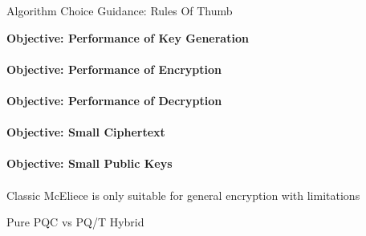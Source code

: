 \begin{minipage}[t]{0.7\textwidth}
\begin{algorithmbox}{Algorithm Choice Guidance: Rules Of Thumb}
\begin{minipage}[t]{0.5\textwidth}
            {\scriptsize \bfseries Objective: Performance of Key Generation}\\[0.1\baselineskip]
            \\[0.75\baselineskip]
            {\scriptsize \bfseries Objective: Performance of Encryption}\\[0.1\baselineskip]
            \\[0.75\baselineskip]
            {\scriptsize \bfseries Objective: Performance of Decryption}\\[0.1\baselineskip]
            \\[0.75\baselineskip]
            {\scriptsize \bfseries Objective: Small Ciphertext}\\[0.1\baselineskip]
            \\[0.75\baselineskip]
            {\scriptsize \bfseries Objective: Small Public Keys}\\[0.1\baselineskip]
            \\[0.75\baselineskip]
            {\tiny * Classic McEliece is only suitable for general encryption with limitations}\\[-0.5\baselineskip]
        \end{minipage}
    \end{algorithmbox}
    \begin{algorithmbox}{Pure PQC vs PQ/T Hybrid}
        \scriptsize

\end{algorithmbox}
\end{minipage}
